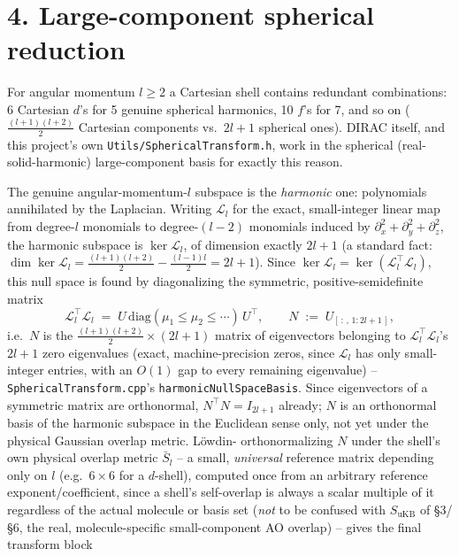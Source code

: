 \documentclass[11pt]{article}
\begin{document}
\section*{4. Large-component spherical reduction}

For angular momentum $l\ge2$ a Cartesian shell contains redundant combinations: 6 Cartesian $d$'s
for 5 genuine spherical harmonics, 10 $f$'s for 7, and so on ($\tfrac{(l+1)(l+2)}2$ Cartesian
components vs.\ $2l+1$ spherical ones). DIRAC itself, and this project's own
\texttt{Utils/SphericalTransform.h}, work in the spherical (real-solid-harmonic) large-component
basis for exactly this reason.

The genuine angular-momentum-$l$ subspace is the \emph{harmonic} one: polynomials annihilated by
the Laplacian. Writing $\mathcal L_l$ for the exact, small-integer linear map from degree-$l$
monomials to degree-$(l-2)$ monomials induced by $\partial_x^2+\partial_y^2+\partial_z^2$, the
harmonic subspace is $\ker\mathcal L_l$, of dimension exactly $2l+1$ (a standard fact:
$\dim\ker\mathcal L_l = \tfrac{(l+1)(l+2)}2-\tfrac{(l-1)l}2 = 2l+1$). Since $\ker\mathcal L_l =
\ker(\mathcal L_l^{\!\top}\mathcal L_l)$, this null space is found by diagonalizing the symmetric,
positive-semidefinite matrix
\begin{equation}
\mathcal L_l^{\!\top}\mathcal L_l \;=\; U\,\mathrm{diag}(\mu_1\le\mu_2\le\cdots)\,U^{\!\top},
\qquad
N \;:=\; U_{[\,:\,,\,1:2l+1\,]},
\end{equation}
i.e.\ $N$ is the $\tfrac{(l+1)(l+2)}2\times(2l+1)$ matrix of eigenvectors belonging to
$\mathcal L_l^{\!\top}\mathcal L_l$'s $2l+1$ zero eigenvalues (exact, machine-precision zeros, since
$\mathcal L_l$ has only small-integer entries, with an $O(1)$ gap to every remaining eigenvalue) --
\texttt{SphericalTransform.cpp}'s \texttt{harmonicNullSpaceBasis}. Since eigenvectors of a symmetric
matrix are orthonormal, $N^{\!\top}N=I_{2l+1}$ already; $N$ is an orthonormal basis of the harmonic
subspace in the Euclidean sense only, not yet under the physical Gaussian overlap metric. Löwdin-
orthonormalizing $N$ under the shell's own physical overlap metric $\bar S_l$ -- a small,
\emph{universal} reference matrix
depending only on $l$ (e.g.\ $6\times6$ for a $d$-shell), computed once from an arbitrary reference
exponent/coefficient, since a shell's self-overlap is always a scalar multiple of it regardless of
the actual molecule or basis set (\emph{not} to be confused with $S_{\text{uKB}}$ of \S3/\S6, the
real, molecule-specific small-component AO overlap) -- gives the final transform block
\end{document}
